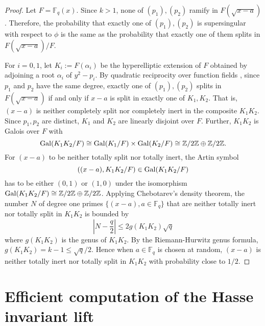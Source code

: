 \documentclass[12pt]{article}
\theoremstyle{plain}
\theoremstyle{definition}
\DeclareMathOperator{\gal}{{\rm Gal}} %
\def\Z{\ensuremath{\mathbb{Z}}}
\def\F{\ensuremath{\mathbb{F}}}
\begin{document}
\begin{proof}
	Let $F = \F_q(x)$. Since $k > 1$, none of $(p_1), (p_2)$ ramify in $F(\sqrt{x-a})$. Therefore, 
	the probability that exactly one of $(p_1), (p_2)$ is supersingular with respect to $\phi$ is 
	the same as the probability that exactly one of them splits in $F(\sqrt{x-a})/F$.
	
	For $i = 0, 1$, let $K_i:=F(\alpha_i)$ be the hyperelliptic extension of $F$ obtained by 
	adjoining a root $\alpha_i$ of $y^2-p_i$. By quadratic reciprocity over function fields 
	\cite{carlitz1932}, since $p_1$ and $p_2$ have the same degree, exactly one of $(p_1), (p_2)$ 
	splits in $F(\sqrt{x-a})$ if and only if $x-a$ is split in exactly one of $K_1, K_2$. That is, 
	$(x-a)$ is neither completely split nor completely inert in the composite $K_1K_2$. Since $p_1, 
	p_2$ are distinct, $K_1$ and $K_2$ are linearly disjoint over $F$. Further, $K_1K_2$ is Galois 
	over $F$ with 
	\[ \gal(K_1K_2/F) \cong \gal(K_1/F) \times \gal(K_2/F) \cong \Z/2\Z \oplus 
	\Z/2\Z. \]  
	For $(x-a)$ to be neither totally split nor totally inert, the Artin symbol 
	\[ ((x-a), K_1K_2/F) \in \gal(K_1K_2/F) \]
	has to be either $(0,1)$ or $(1,0)$ under the isomorphism $\gal(K_1K_2/F) \cong \Z/2\Z \oplus 
	\Z/2\Z$. Applying Chebotarev's density theorem, the number $N$ of degree one primes $\{(x-a), a 
	\in \F_q\}$ that are neither totally inert nor totally split in $K_1K_2$ is bounded by 
	\[ \left|N - \frac{q}{2} \right| \le 2 g(K_1K_2)\sqrt{q} \]
	where $g(K_1K_2)$ is the genus of $K_1K_2$. By the Riemann-Hurwitz genus formula, $g(K_1K_2) = 
	k-1 \le \sqrt{q}/2$. Hence when $a \in \F_q$ is chosen at random, $(x-a)$ is neither totally 
	inert nor totally split in $K_1K_2$ with probability close to $1/2$. 
\end{proof}


 
 

\section{Efficient computation of the Hasse invariant lift}
\label{sec:hasse}
\end{document}
